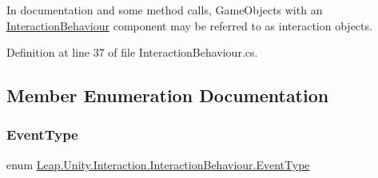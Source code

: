 In documentation and some method calls, Game\+Objects with an \mbox{\hyperlink{class_leap_1_1_unity_1_1_interaction_1_1_interaction_behaviour}{Interaction\+Behaviour}} component may be referred to as interaction objects. 

Definition at line 37 of file Interaction\+Behaviour.\+cs.



\subsection{Member Enumeration Documentation}
\mbox{\label{class_leap_1_1_unity_1_1_interaction_1_1_interaction_behaviour_a52fd19688439f6e2c5131a5c15e64926}} 
\subsubsection{\texorpdfstring{EventType}{EventType}}
{\footnotesize\ttfamily enum \mbox{\hyperlink{class_leap_1_1_unity_1_1_interaction_1_1_interaction_behaviour_a52fd19688439f6e2c5131a5c15e64926}{Leap.\+Unity.\+Interaction.\+Interaction\+Behaviour.\+Event\+Type}}\hspace{0.3cm}{\ttfamily [strong]}}

